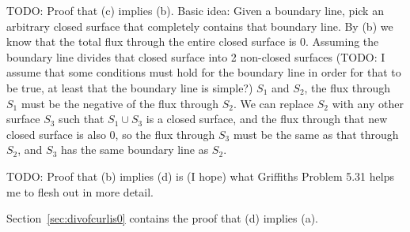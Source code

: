 \documentclass[a4paper]{article}
\theoremstyle{plain}
\theoremstyle{definition}
\begin{document}
TODO: Proof that (c) implies (b).  Basic idea: Given a boundary line,
pick an arbitrary closed surface that completely contains that
boundary line.  By (b) we know that the total flux through the entire
closed surface is 0.  Assuming the boundary line divides that closed
surface into 2 non-closed surfaces (TODO: I assume that some
conditions must hold for the boundary line in order for that to be
true, at least that the boundary line is simple?) $S_1$ and $S_2$, the
flux through $S_1$ must be the negative of the flux through $S_2$.  We
can replace $S_2$ with any other surface $S_3$ such that $S_1 \cup
S_3$ is a closed surface, and the flux through that new closed surface
is also 0, so the flux through $S_3$ must be the same as that through
$S_2$, and $S_3$ has the same boundary line as $S_2$.

TODO: Proof that (b) implies (d) is (I hope) what Griffiths Problem
5.31 helps me to flesh out in more detail.

Section~\ref{sec:divofcurlis0} contains the proof that (d) implies
(a).
\end{document}
